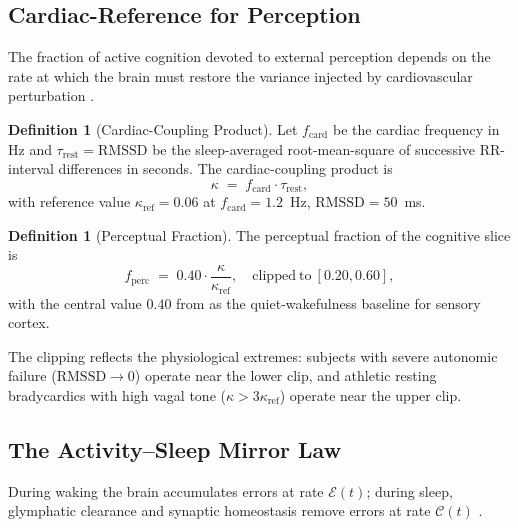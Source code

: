\documentclass[11pt,twocolumn,a4paper]{article}
\theoremstyle{definition}
\newtheorem{definition}[theorem]{Definition}
\theoremstyle{remark}
\newcommand{\fcard}{f_{\mathrm{card}}}
\newcommand{\taurest}{\tau_{\mathrm{rest}}}
\newcommand{\RMSSD}{\mathrm{RMSSD}}
\begin{document}
\subsection{Cardiac-Reference for Perception}

The fraction of active cognition devoted to external perception
depends on the rate at which the brain must restore the variance
injected by cardiovascular perturbation \citep{critchley2005, saper2002}.

\begin{definition}[Cardiac-Coupling Product]
\label{def:kappa}
Let $\fcard$ be the cardiac frequency in Hz and $\taurest = \RMSSD$
be the sleep-averaged root-mean-square of successive RR-interval
differences in seconds. The cardiac-coupling product is
\begin{equation}
\kappa \;=\; \fcard \cdot \taurest,
\end{equation}
with reference value $\kappa_{\mathrm{ref}} = 0.06$ at $\fcard =
1.2$~Hz, $\RMSSD = 50$~ms.
\end{definition}

\begin{definition}[Perceptual Fraction]
\label{def:fperc}
The perceptual fraction of the cognitive slice is
\begin{equation}
f_{\mathrm{perc}} \;=\; 0.40 \cdot \frac{\kappa}{\kappa_{\mathrm{ref}}},
\quad \mathrm{clipped\ to}\ [0.20, 0.60],
\end{equation}
with the central value $0.40$ from \citet{koch2004} as the
quiet-wakefulness baseline for sensory cortex.
\end{definition}

The clipping reflects the physiological extremes: subjects with
severe autonomic failure ($\RMSSD \to 0$) operate near the lower
clip, and athletic resting bradycardics with high vagal tone
($\kappa > 3 \kappa_{\mathrm{ref}}$) operate near the upper clip.

\subsection{The Activity--Sleep Mirror Law}

During waking the brain accumulates errors at rate $\mathcal{E}(t)$;
during sleep, glymphatic clearance and synaptic homeostasis remove
errors at rate $\mathcal{C}(t)$ \citep{xie2013, hablitz2020,
benveniste2019, tononi2014}.
\end{document}
